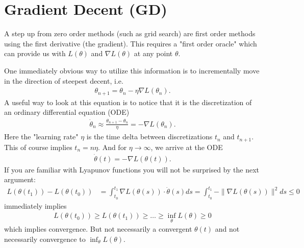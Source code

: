 
\newcommand{\identity}{\mathbb{I}}
\newcommand{\lbound}{\mu_l}
\newcommand{\ubound}{\mu_u}
\newcommand{\diag}{\text{diag}}
\newcommand{\rate}{\text{rate}}
\newcommand{\reals}{\mathbb{R}}
\newcommand{\firstOrderMethod}{\mathcal{M}}
\newcommand{\linSpan}{\text{span}}
\newcommand{\dimension}{d}

\chapter{Gradient Decent (GD)}

A step up from zero order methods (such as grid search) are first order methods
using the first derivative (the gradient). This requires a "first order oracle"
which can provide us with \(L(\theta)\) and \(\nabla L(\theta)\) at any point
\(\theta\).

One immediately obvious way to utilize this information is to
incrementally move in the direction of steepest decent, i.e.
%
\begin{align*}
	\theta_{n+1} = \theta_n - \eta\nabla L(\theta_n).
\end{align*}
%
A useful way to look at this equation is to notice that it is the
discretization of an ordinary differential equation (ODE)
%
\begin{align*}
	\dot{\theta}_n \approx \frac{\theta_{n+1} - \theta_n}{\eta}
	= - \nabla L(\theta_n).
\end{align*}
%
Here the "learning rate" \(\eta\) is the time delta between discretizations
\(t_n\) and \(t_{n+1}\). This of course implies \(t_n = n\eta\). And for
\(\eta\to\infty\), we arrive at the ODE
%
\begin{align}\label{eq: velocity is gradient}
	\dot{\theta}(t) = -\nabla L(\theta(t)).
\end{align}
%
If you are familiar with Lyapunov functions you will not be surprised by the next
argument:
%
\begin{align}\label{eq: gradient integral}
	L(\theta(t_1)) - L(\theta(t_0))
	&= \int_{t_0}^{t_1} \nabla L(\theta(s)) \cdot \dot{\theta}(s) ds
	= \int_{t_0}^{t_1} -\|\nabla L(\theta(s))\|^2 ds
	\le 0
\end{align}
%
immediately implies
\begin{align*}
	L(\theta(t_0)) \ge L(\theta(t_1)) \ge \dots \ge \inf_\theta L(\theta) \ge 0
\end{align*}
which implies convergence. But not necessarily a convergent \(\theta(t)\) and
not necessarily convergence to \(\inf_\theta L(\theta)\).

